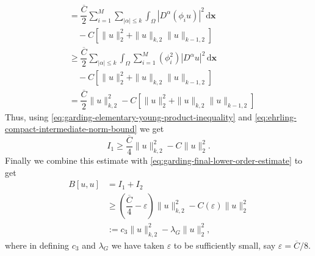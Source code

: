\begin{Proof}
\[\begin{aligned}
&=\dfrac{\overline C}{2}\sum_{i=1}^M\sum_{|\alpha|\leq k}\int_\Omega|D^\alpha(\phi_i u)|^2\,\mathrm{d}\bm{x}\\
&\quad-C[\|u\|_2^2+\|u\|_{k,2}\|u\|_{k-1,2}]\\
&\geq\dfrac{\overline C}{2}\sum_{|\alpha|\leq k}\int_\Omega\sum_{i=1}^M(\phi_i^2)|D^\alpha u|^2\,\mathrm{d}\bm{x}\\
&\quad-C[\|u\|_2^2+\|u\|_{k,2}\|u\|_{k-1,2}]\\
&=\dfrac{\overline C}{2}\|u\|_{k,2}^2-C[\|u\|_2^2+\|u\|_{k,2}\|u\|_{k-1,2}]
\end{aligned}\]Thus, using \eqref{eq:garding-elementary-young-product-inequality} and \eqref{eq:ehrling-compact-intermediate-norm-bound} we get
\begin{equation}\label{eq:garding-global-principal-part-lower-bound}
I_1\geq\dfrac{\overline C}{4}\|u\|_{k,2}^2-C\|u\|_2^2.
\end{equation}
Finally we combine this estimate with \eqref{eq:garding-final-lower-order-estimate} to get\[\begin{aligned}
B[u,u]&=I_1+I_2\\
&\geq\left(\dfrac{\overline C}{4}-\varepsilon\right)\|u\|_{k,2}^2-C(\varepsilon)\|u\|_2^2\\
&:=c_3\|u\|_{k,2}^2-\lambda_G\|u\|_2^2,
\end{aligned}\]where in defining $c_3$ and $\lambda_G$ we have taken $\varepsilon$ to be sufficiently small, say $\varepsilon=\overline C/8$.
\end{Proof}
\endgroup
